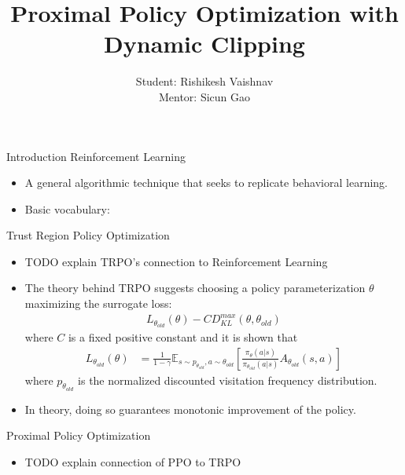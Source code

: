\documentclass{beamer}
\title{Proximal Policy Optimization with Dynamic Clipping}
\author{Student: Rishikesh Vaishnav\\Mentor: Sicun Gao}
\begin{document}
\maketitle
\begin{frame}{Introduction}
    Reinforcement Learning
    \begin{itemize}
        \item A general algorithmic technique that seeks to replicate behavioral
            learning.
        \item Basic vocabulary:

            
    \end{itemize}
    \framebreak
    Trust Region Policy Optimization
    \begin{itemize}
        \item TODO explain TRPO's connection to Reinforcement Learning
        \item The theory behind TRPO suggests choosing a policy parameterization
            $\theta$ maximizing the surrogate loss:
            \begin{align*}
                L_{\theta_{old}}(\theta) 
                - CD_{KL}^{max}(\theta, \theta_{old})
            \end{align*}
            where $C$ is a fixed positive constant and it is shown that 
            \begin{align*}
                L_{\theta_{old}}(\theta) &= \frac{1}{1 - \gamma}
                \mathbb{E}_{s \sim p_{\theta_{old}}, a \sim \theta_{old}}
                \left[
                \frac
                {\pi_{\theta}(a | s)}
                {\pi_{\theta_{old}} (a | s)}
                A_{\theta_{old}}(s, a)
                \right]
            \end{align*}
            where $p_{\theta_{old}}$ is the normalized discounted visitation
            frequency distribution.
        \item In theory, doing so guarantees monotonic improvement of the
            policy.
    \end{itemize}
    \framebreak
    Proximal Policy Optimization
    \begin{itemize}
        \item TODO explain connection of PPO to TRPO
    \end{itemize}
\end{frame}
\end{document}
